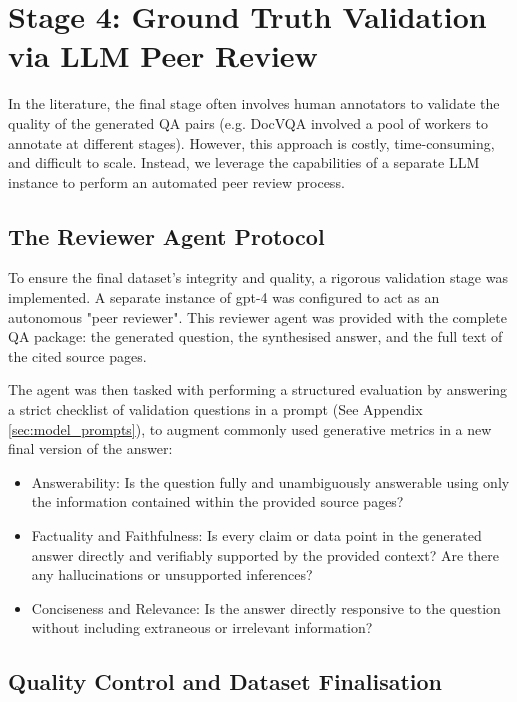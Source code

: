 \documentclass[12pt,twoside]{report}
\begin{document}
\section{Stage 4: Ground Truth Validation via LLM Peer Review}

In the literature, the final stage often involves human annotators to validate the quality of the generated QA pairs (e.g. DocVQA involved a pool of workers to annotate at different stages\cite{DocVQA}). However, this approach is costly, time-consuming, and difficult to scale. Instead, we leverage the capabilities of a separate LLM instance to perform an automated peer review process.

\subsection{The Reviewer Agent Protocol}

To ensure the final dataset's integrity and quality, a rigorous validation stage was implemented. A separate instance of gpt-4 was configured to act as an autonomous "peer reviewer". This reviewer agent was provided with the complete QA package: the generated question, the synthesised answer, and the full text of the cited source pages.

The agent was then tasked with performing a structured evaluation by answering a strict checklist of validation questions in a prompt (See Appendix \ref{sec:model_prompts}), to augment commonly used generative metrics in a new final version of the answer:

\begin{itemize}
\item{Answerability}: Is the question fully and unambiguously answerable using only the information contained within the provided source pages?

\item{Factuality and Faithfulness}: Is every claim or data point in the generated answer directly and verifiably supported by the provided context? Are there any hallucinations or unsupported inferences?

\item{Conciseness and Relevance}: Is the answer directly responsive to the question without including extraneous or irrelevant information?
\end{itemize}

\subsection{Quality Control and Dataset Finalisation}
\end{document}
